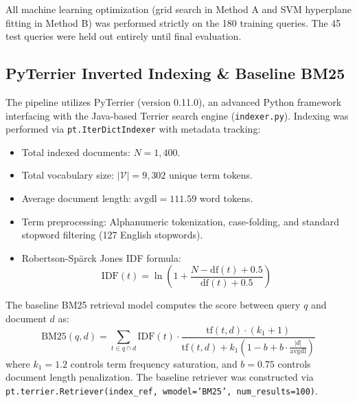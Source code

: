\documentclass[11pt,a4paper]{article}
\begin{document}
All machine learning optimization (grid search in Method A and SVM hyperplane fitting in Method B) was performed strictly on the 180 training queries. The 45 test queries were held out entirely until final evaluation.

\subsection{PyTerrier Inverted Indexing & Baseline BM25}
The pipeline utilizes PyTerrier (version 0.11.0), an advanced Python framework interfacing with the Java-based Terrier search engine (\texttt{indexer.py}). Indexing was performed via \texttt{pt.IterDictIndexer} with metadata tracking:
\begin{itemize}[leftmargin=*]
    \item Total indexed documents: $N = 1,400$.
    \item Total vocabulary size: $|\mathcal{V}| = 9,302$ unique term tokens.
    \item Average document length: $\text{avgdl} = 111.59$ word tokens.
    \item Term preprocessing: Alphanumeric tokenization, case-folding, and standard stopword filtering (127 English stopwords).
    \item Robertson-Sp\"{a}rck Jones IDF formula:
    \begin{equation}
    \text{IDF}(t) = \ln\left(1 + \frac{N - \text{df}(t) + 0.5}{\text{df}(t) + 0.5}\right)
    \label{eq:rsj_idf}
    \end{equation}
\end{itemize}

The baseline BM25 retrieval model computes the score between query $q$ and document $d$ as:
\begin{equation}
\text{BM25}(q, d) = \sum_{t \in q \cap d} \text{IDF}(t) \cdot \frac{\text{tf}(t, d) \cdot (k_1 + 1)}{\text{tf}(t, d) + k_1 \left(1 - b + b \cdot \frac{|d|}{\text{avgdl}}\right)}
\label{eq:bm25_formula}
\end{equation}
where $k_1 = 1.2$ controls term frequency saturation, and $b = 0.75$ controls document length penalization. The baseline retriever was constructed via \texttt{pt.terrier.Retriever(index\_ref, wmodel='BM25', num\_results=100)}.
\end{document}
